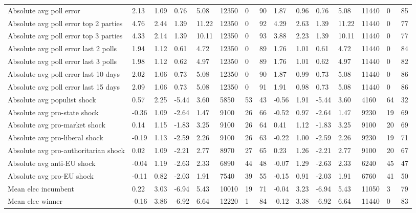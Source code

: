 \begin{longtable}{lllllllllllllll}
Absolute avg poll error & 2.13 & 1.09 & 0.76 & 5.08 & 12350 & 0 & 90 & 1.87 & 0.96 & 0.76 & 5.08 & 11440 & 0 & 85\\
Absolute avg poll error top 2 parties & 4.76 & 2.44 & 1.39 & 11.22 & 12350 & 0 & 92 & 4.29 & 2.63 & 1.39 & 11.22 & 11440 & 0 & 77\\
Absolute avg poll error top 3 parties & 4.33 & 2.14 & 1.39 & 10.11 & 12350 & 0 & 93 & 3.88 & 2.23 & 1.39 & 10.11 & 11440 & 0 & 77\\
\addlinespace
Absolute avg poll error last 2 polls & 1.94 & 1.12 & 0.61 & 4.72 & 12350 & 0 & 89 & 1.76 & 1.01 & 0.61 & 4.72 & 11440 & 0 & 84\\
Absolute avg poll error last 3 polls & 1.98 & 1.12 & 0.62 & 4.97 & 12350 & 0 & 89 & 1.76 & 1.01 & 0.62 & 4.97 & 11440 & 0 & 82\\
Absolute avg poll error last 10 days & 2.02 & 1.06 & 0.73 & 5.08 & 12350 & 0 & 90 & 1.87 & 0.99 & 0.73 & 5.08 & 11440 & 0 & 86\\
Absolute avg poll error last 15 days & 2.09 & 1.06 & 0.73 & 5.08 & 12350 & 0 & 91 & 1.91 & 0.98 & 0.73 & 5.08 & 11440 & 0 & 86\\
Absolute avg populist shock & 0.57 & 2.25 & -5.44 & 3.60 & 5850 & 53 & 43 & -0.56 & 1.91 & -5.44 & 3.60 & 4160 & 64 & 32\\
\addlinespace
Absolute avg pro-state shock & -0.36 & 1.09 & -2.64 & 1.47 & 9100 & 26 & 66 & -0.52 & 0.97 & -2.64 & 1.47 & 9230 & 19 & 69\\
Absolute avg pro-market shock & 0.14 & 1.15 & -1.83 & 3.25 & 9100 & 26 & 64 & 0.41 & 1.12 & -1.83 & 3.25 & 9100 & 20 & 69\\
Absolute avg pro-liberal shock & -0.19 & 1.13 & -2.59 & 2.26 & 9100 & 26 & 63 & -0.22 & 1.00 & -2.59 & 2.26 & 9230 & 19 & 71\\
Absolute avg pro-authoritarian shock & 0.02 & 1.09 & -2.21 & 2.77 & 8970 & 27 & 65 & 0.23 & 1.26 & -2.21 & 2.77 & 9100 & 20 & 67\\
Absolute avg anti-EU shock & -0.04 & 1.19 & -2.63 & 2.33 & 6890 & 44 & 48 & -0.07 & 1.29 & -2.63 & 2.33 & 6240 & 45 & 47\\
\addlinespace
Absolute avg pro-EU shock & -0.11 & 0.82 & -2.03 & 1.91 & 7540 & 39 & 55 & -0.15 & 0.91 & -2.03 & 1.91 & 6760 & 41 & 50\\
Mean elec incumbent & 0.22 & 3.03 & -6.94 & 5.43 & 10010 & 19 & 71 & -0.04 & 3.23 & -6.94 & 5.43 & 11050 & 3 & 79\\
Mean elec winner & -0.16 & 3.86 & -6.92 & 6.64 & 12220 & 1 & 84 & -0.12 & 3.38 & -6.92 & 6.64 & 11440 & 0 & 83\\

\end{longtable}
